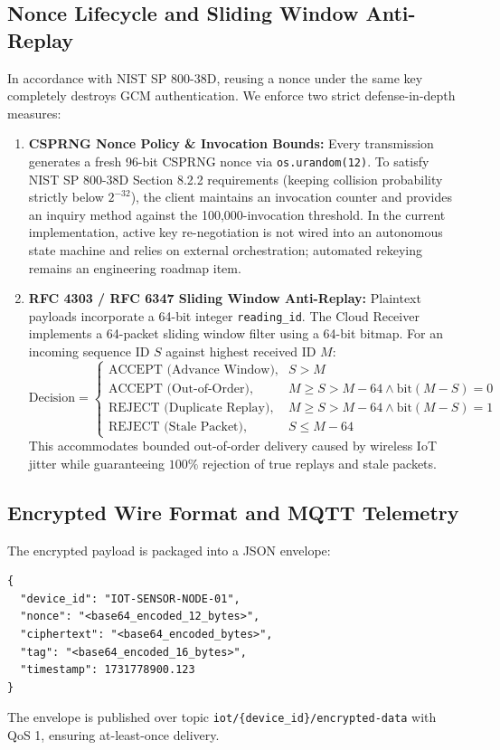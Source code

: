 \documentclass[journal,10pt,twocolumn]{article}
\begin{document}
\subsection{Nonce Lifecycle and Sliding Window Anti-Replay}
In accordance with NIST SP 800-38D, reusing a nonce under the same key completely destroys GCM authentication. We enforce two strict defense-in-depth measures:
\begin{enumerate}
    \item \textbf{CSPRNG Nonce Policy \& Invocation Bounds:} Every transmission generates a fresh 96-bit CSPRNG nonce via \texttt{os.urandom(12)}. To satisfy NIST SP 800-38D Section 8.2.2 requirements (keeping collision probability strictly below $2^{-32}$), the client maintains an invocation counter and provides an inquiry method against the 100,000-invocation threshold. In the current implementation, active key re-negotiation is not wired into an autonomous state machine and relies on external orchestration; automated rekeying remains an engineering roadmap item.
    \item \textbf{RFC 4303 / RFC 6347 Sliding Window Anti-Replay:} Plaintext payloads incorporate a 64-bit integer \texttt{reading\_id}. The Cloud Receiver implements a 64-packet sliding window filter using a 64-bit bitmap. For an incoming sequence ID $S$ against highest received ID $M$:
    \begin{equation}
    \text{Decision} = 
    \begin{cases}
    \text{ACCEPT (Advance Window)}, & S > M \\
    \text{ACCEPT (Out-of-Order)}, & M \ge S > M-64 \land \text{bit}(M-S)=0 \\
    \text{REJECT (Duplicate Replay)}, & M \ge S > M-64 \land \text{bit}(M-S)=1 \\
    \text{REJECT (Stale Packet)}, & S \le M - 64
    \end{cases}
    \end{equation}
    This accommodates bounded out-of-order delivery caused by wireless IoT jitter while guaranteeing $100\%$ rejection of true replays and stale packets.
\end{enumerate}

\subsection{Encrypted Wire Format and MQTT Telemetry}
The encrypted payload is packaged into a JSON envelope:
\begin{verbatim}
{
  "device_id": "IOT-SENSOR-NODE-01",
  "nonce": "<base64_encoded_12_bytes>",
  "ciphertext": "<base64_encoded_bytes>",
  "tag": "<base64_encoded_16_bytes>",
  "timestamp": 1731778900.123
}
\end{verbatim}
The envelope is published over topic \texttt{iot/\{device\_id\}/encrypted-data} with QoS 1, ensuring at-least-once delivery.
\end{document}
